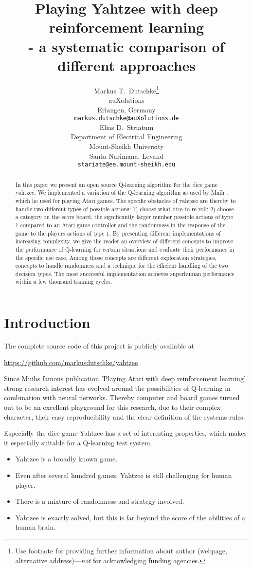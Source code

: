 \documentclass{article}
\title{Playing Yahtzee with deep reinforcement learning\\- a systematic comparison of different approaches}
\author{
  Markus T.~Dutschke\thanks{Use footnote for providing further
    information about author (webpage, alternative
    address)---\emph{not} for acknowledging funding agencies.} \\
  auXolutions\\
  Erlangen, Germany\\
  \texttt{markus.dutschke@auXolutions.de} \\
   \And
 Elias D.~Striatum \\
  Department of Electrical Engineering\\
  Mount-Sheikh University\\
  Santa Narimana, Levand \\
  \texttt{stariate@ee.mount-sheikh.edu} \\
}
\begin{document}
\maketitle

\begin{abstract}
In this paper we present an open source Q-learning algorithm for the dice game yahtzee.
We implemented a variation of the Q-learning algorithm as used by Mnih \cite{mnih13},
which he used for playing Atari games.
The specific obstacles of yahtzee are thereby
to handle two different types of possible actions:
  1) choose what dice to re-roll;
  2) choose a category on the score board,
the significantly larger number possible actions of type 1 compared to an Atari game controller
and
the randomness in the response of the game to the players actions of type 1.
By presenting different implementations of increasing complexity,
we give the reader an overview of different concepts to improve the performance of Q-learning
for certain situations and evaluate their performance in the specific use case.
Among those concepts are different exploration strategies, concepts to handle randomness and
a technique for the efficient handling of the two decision types.
The most successful implementation achieves superhuman performance within a few thousand training cycles.
\end{abstract}




\section{Introduction}

The complete source code of this project is publicly available at
\begin{center}
  \url{https://github.com/markusdutschke/yahtzee}
\end{center}

Since Mnihs famous publication 'Playing Atari with deep reinforcement learning' \cite{mnih13}
strong research interest has evolved around the possibilities of Q-learning in combination with neural networks.
Thereby computer and board games turned out to be an excellent playground for this research,
due to their complex character, their easy reproducibility and the clear definition of the systems rules.

Especially the dice game Yahtzee has a set of interesting properties,
which makes it especially suitable for a Q-learning test system.
\begin{itemize}
\item Yahtzee is a broadly known game.
\item Even after several hundred games, Yahtzee is still challenging for human player.
\item There is a mixture of randomness and strategy involved.
\item Yahtzee is exactly solved, but this is far beyond the score of the abilities of a human brain.
\end{itemize}
\end{document}
